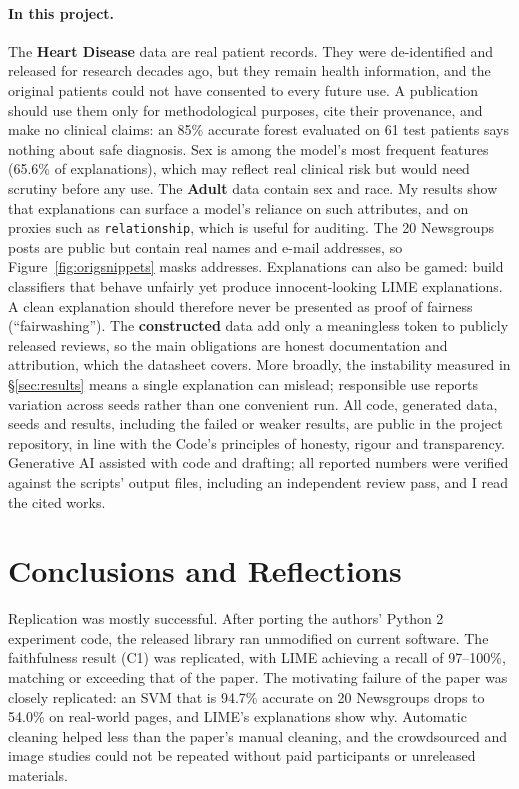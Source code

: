 \documentclass[11pt]{article}
\newcommand{\tok}[1]{\texttt{#1}}
\begin{document}
\paragraph{In this project.} The \textbf{Heart Disease} data are real patient records. They were de-identified and released for research decades ago, but they remain health information, and the original patients could not have consented to every future use. A publication should use them only for methodological purposes, cite their provenance, and make no clinical claims: an 85\% accurate forest evaluated on 61 test patients says nothing about safe diagnosis. Sex is among the model's most frequent features (65.6\% of explanations), which may reflect real clinical risk but would need scrutiny before any use. The \textbf{Adult} data contain sex and race. My results show that explanations can surface a model's reliance on such attributes, and on proxies such as \tok{relationship}, which is useful for auditing. The 20 Newsgroups posts are public but contain real names and e-mail addresses, so Figure~\ref{fig:origsnippets} masks addresses. Explanations can also be gamed: \citet{slack2020fooling} build classifiers that behave unfairly yet produce innocent-looking LIME explanations. A clean explanation should therefore never be presented as proof of fairness (``fairwashing''). The \textbf{constructed} data add only a meaningless token to publicly released reviews, so the main obligations are honest documentation and attribution, which the datasheet covers. More broadly, the instability measured in \S\ref{sec:results} means a single explanation can mislead; responsible use reports variation across seeds rather than one convenient run. All code, generated data, seeds and results, including the failed or weaker results, are public in the project repository, in line with the Code's principles of honesty, rigour and transparency. Generative AI assisted with code and drafting; all reported numbers were verified against the scripts' output files, including an independent review pass, and I read the cited works.

\section{Conclusions and Reflections}
\label{sec:conclusion}

Replication was mostly successful. After porting the authors' Python 2 experiment code, the released library ran unmodified on current software. The faithfulness result (C1) was replicated, with LIME achieving a recall of 97--100\%, matching or exceeding that of the paper. The motivating failure of the paper was closely replicated: an SVM that is 94.7\% accurate on 20 Newsgroups drops to 54.0\% on real-world pages, and LIME's explanations show why. Automatic cleaning helped less than the paper's manual cleaning, and the crowdsourced and image studies could not be repeated without paid participants or unreleased materials.
\end{document}
